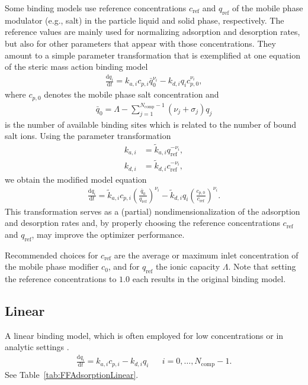 Some binding models use reference concentrations $c_{\text{ref}}$ and $q_{\text{ref}}$ of the mobile phase modulator (e.g., salt) in the particle liquid and solid phase, respectively. 
The reference values are mainly used for normalizing adsorption and desorption rates, but also for other parameters that appear with those concentrations.
They amount to a simple parameter transformation that is exemplified at one equation of the steric mass action binding model
\begin{align*}
  \frac{\mathrm{d} q_i}{\mathrm{d} t} = k_{a,i} c_{p,i}\bar{q}_0^{\nu_i} - k_{d,i} q_i c_{p,0}^{\nu_i},
\end{align*}
where $c_{p,0}$ denotes the mobile phase salt concentration and
\begin{align*}
  \bar{q}_0 = \Lambda - \sum_{j=1}^{N_{\text{comp}} - 1} \left( \nu_j + \sigma_j \right) q_j
\end{align*}
is the number of available binding sites which is related to the number of bound salt ions.
Using the parameter transformation
\begin{align*}
  k_{a,i} &= \tilde{k}_{a,i} q_{\text{ref}}^{-\nu_i}, \\
  k_{d,i} &= \tilde{k}_{d,i} c_{\text{ref}}^{-\nu_i},
\end{align*}
we obtain the modified model equation
\begin{align*}
  \frac{\mathrm{d} q_i}{\mathrm{d} t} = \tilde{k}_{a,i} c_{p,i} \left(\frac{\bar{q}_0}{q_{\text{ref}}}\right)^{\nu_i} - \tilde{k}_{d,i} q_i \left(\frac{c_{p,0}}{c_{\text{ref}}}\right)^{\nu_i}.
\end{align*}
This transformation serves as a (partial) nondimensionalization of the adsorption and desorption rates and, by properly choosing the reference concentrations $c_{\text{ref}}$ and $q_{\text{ref}}$, may improve the optimizer performance.

Recommended choices for $c_{\text{ref}}$ are the average or maximum inlet concentration of the mobile phase modifier $c_0$, and for $q_{\text{ref}}$ the ionic capacity $\Lambda$.
Note that setting the reference concentrations to $\num{1.0}$ each results in the original binding model.

\subsection{Linear}\label{sec:MBLinear}

A linear  binding model, which is often employed for low concentrations or in analytic settings \cite{Guiochon2006}.
\begin{align*}
  \frac{\mathrm{d} q_i}{\mathrm{d} t} = k_{a,i} c_{p,i} - k_{d,i} q_i && i = 0, \dots, N_{\text{comp}} - 1.
\end{align*}
See Table~\ref{tab:FFAdsorptionLinear}.

